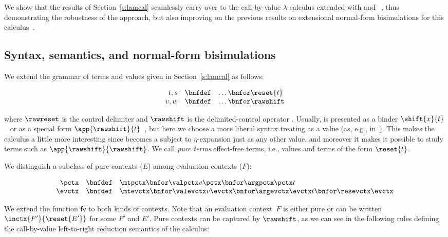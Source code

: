 \documentclass{lmcs}
\theoremstyle{defC}
\begin{document}
We show that the results of Section~\ref{s:lamcal} seamlessly carry over to the
call-by-value $\lambda$-calculus extended with \textshift{} and
\textreset{}~\cite{Danvy-Filinski:LFP90,Biernacki-al:HAL15}, thus demonstrating
the robustness of the approach, but also improving on the previous results on
extensional normal-form bisimulations for this
calculus~\cite{Biernacki-al:HAL15}.

\subsection{Syntax, semantics, and normal-form bisimulations}%
\label{ss:delcon-calculus}

We extend the grammar of terms and values given in Section~\ref{s:lamcal} as
follows:

\[
\begin{array}{rcl}
  t,s & \bnfdef & \dots \bnfor \reset{t}
  \\
  v,w & \bnfdef & \dots \bnfor \rawshift
\end{array}
\]

\vspace{2mm}\noindent where $\rawreset$ is the control delimiter \textreset{}
and $\rawshift$ is the delimited-control operator \textshift{}. Usually,
\textshift{} is presented as a binder
$\shift{x}{t}$~\cite{Danvy-Filinski:LFP90,Biernacki-al:HAL15} or as a special
form $\app{\rawshift}{t}$~\cite{Filinski:POPL94}, but here we choose a more
liberal syntax treating \textshift{} as a value (as, e.g.,
in~\cite{Kameyama:HOSC07}). This makes the calculus a little more interesting
since \textshift{} becomes a subject to $\eta$-expansion just as any other
value, and moreover it makes it possible to study terms such as
$\app{\rawshift}{\rawshift}$. We call \emph{pure terms} effect-free terms, i.e.,
values and terms of the form $\reset{t}$.

We distinguish a subclass of pure contexts ($E$) among evaluation contexts
($F$):

\[
\begin{array}{rcl}
  \pctx
  & \bnfdef &
  \mtpctx
  \bnfor \valpctx v \pctx
  \bnfor \argpctx \pctx t
  \\
  \evctx
  & \bnfdef &
  \mtevctx
  \bnfor \valevctx v \evctx
  \bnfor \argevctx \evctx t
  \bnfor \resevctx \evctx
\end{array}
\]

\vspace{2mm}\noindent We extend the function $\mathsf{fv}$ to both kinds of
contexts. Note that an evaluation context~$F$ is either pure or can be written
$\inctx{F'}{\reset{E'}}$ for some $F'$ and $E'$. Pure contexts can be captured
by $\rawshift$, as we can see in the following rules defining the call-by-value
left-to-right reduction semantics of the calculus:
%
\end{document}
